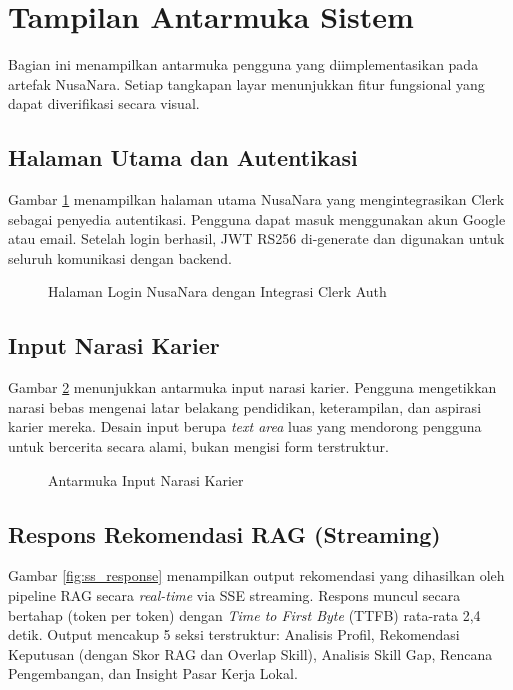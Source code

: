 \section{Tampilan Antarmuka Sistem}

Bagian ini menampilkan antarmuka pengguna yang diimplementasikan pada artefak NusaNara.
Setiap tangkapan layar menunjukkan fitur fungsional yang dapat diverifikasi secara visual.

\subsection{Halaman Utama dan Autentikasi}

Gambar \ref{fig:ss_login} menampilkan halaman utama NusaNara yang mengintegrasikan
Clerk sebagai penyedia autentikasi. Pengguna dapat masuk menggunakan akun Google atau
email. Setelah login berhasil, JWT RS256 di-generate dan digunakan untuk seluruh
komunikasi dengan backend.

\begin{figure}[H]
  \centering
  \caption{Halaman Login NusaNara dengan Integrasi Clerk Auth}
  \label{fig:ss_login}
\end{figure}

\subsection{Input Narasi Karier}

Gambar \ref{fig:ss_input} menunjukkan antarmuka input narasi karier. Pengguna
mengetikkan narasi bebas mengenai latar belakang pendidikan, keterampilan, dan
aspirasi karier mereka. Desain input berupa \textit{text area} luas yang mendorong
pengguna untuk bercerita secara alami, bukan mengisi form terstruktur.

\begin{figure}[H]
  \centering
  \caption{Antarmuka Input Narasi Karier}
  \label{fig:ss_input}
\end{figure}

\subsection{Respons Rekomendasi RAG (Streaming)}

Gambar \ref{fig:ss_response} menampilkan output rekomendasi yang dihasilkan oleh
pipeline RAG secara \textit{real-time} via SSE streaming. Respons muncul secara
bertahap (token per token) dengan \textit{Time to First Byte} (TTFB) rata-rata
2,4 detik. Output mencakup 5 seksi terstruktur: Analisis Profil, Rekomendasi
Keputusan (dengan Skor RAG dan Overlap Skill), Analisis Skill Gap, Rencana
Pengembangan, dan Insight Pasar Kerja Lokal.

